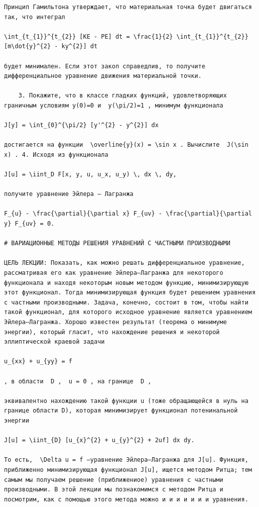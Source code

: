 \documentclass[
  ukrainian,
]{article}
\begin{document}
\begin{verbatim}
Принцип Гамильтона утверждает, что материальная точка будет двигаться так, что интеграл

\int_{t_{1}}^{t_{2}} [KE - PE] dt = \frac{1}{2} \int_{t_{1}}^{t_{2}} [m\dot{y}^{2} - ky^{2}] dt

будет минимален. Если этот закоп справедлив, то получите дифференциальное уравнение движения материальной точки.

    3. Покажите, что в классе гладких функций, удовлетворяющих граничным условиям y(0)=0 и  y(\pi/2)=1 , минимум функционала

J[y] = \int_{0}^{\pi/2} [y'^{2} - y^{2}] dx

достигается на функции  \overline{y}(x) = \sin x . Вычислите  J(\sin x) . 4. Исходя из функционала

J[u] = \iint_D F[x, y, u, u_x, u_y) \, dx \, dy,

получите уравнение Эйлера — Лагранжа

F_{u} - \frac{\partial}{\partial x} F_{uv} - \frac{\partial}{\partial y} F_{uv} = 0.

# ВАРИАЦИОННЫЕ МЕТОДЫ РЕШЕНИЯ УРАВНЕНИЙ С ЧАСТНЫМИ ПРОИЗВОДНЫМИ

ЦЕЛЬ ЛЕКЦИИ: Показать, как можно решать дифференциальное уравнение, рассматривая его как уравнение Эйлера—Лагранжа для некоторого функционала и находя некоторым новым методом функцию, минимизирующую этот функционал. Тогда минимизирующая функция будет решением уравнения с частными производными. Задача, конечно, состоит в том, чтобы найти такой функционал, для которого исходное уравнение является уравнением Эйлера—Лагранжа. Хорошо известен результат (теорема о минимуме энергии), который гласит, что нахождение решения и некоторой эллиптической краевой задачи

u_{xx} + u_{yy} = f

, в области  D ,  u = 0 , на границе  D ,

эквивалентно нахождению такой функции u (тоже обращающейся в нуль на границе области D), которая минимизирует функционал потенинальной энергии

J[u] = \iint_{D} [u_{x}^{2} + u_{y}^{2} + 2uf] dx dy.

То есть,  \Delta u = f —уравнение Эйлера—Лагранжа для J[u]. Функция, приближенно минимизирующая функционал J[u], ищется методом Ритца; тем самым мы получаем решение (приближениое) уравнения с частными производными. В этой лекции мы познакомимся с методом Ритца и посмотрим, как с помощью этого метода можно и и и и и и и уравнения.


\end{verbatim}
\end{document}

